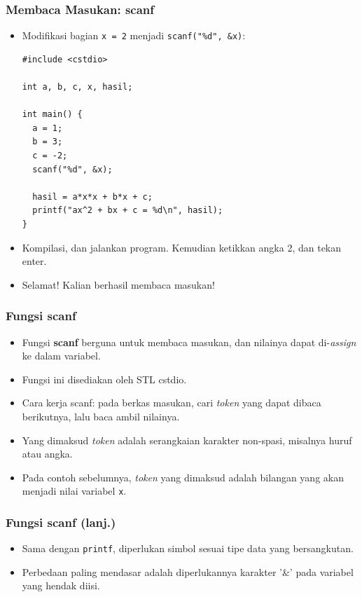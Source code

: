 \begin{frame}[fragile]
\frametitle{Membaca Masukan: scanf}
\begin{itemize}
  \item Modifikasi bagian \texttt{x = 2} menjadi \texttt{scanf("\%d", \&x)}:
\begin{lstlisting}
#include <cstdio>

int a, b, c, x, hasil;

int main() {
  a = 1;
  b = 3;
  c = -2;
  scanf("%d", &x);

  hasil = a*x*x + b*x + c;
  printf("ax^2 + bx + c = %d\n", hasil);
}
\end{lstlisting}
  \item Kompilasi, dan jalankan program. Kemudian ketikkan angka 2, dan tekan enter.
  \item Selamat! Kalian berhasil membaca masukan!
\end{itemize}
\end{frame}

\begin{frame}[fragile]
\frametitle{Fungsi scanf}
  \begin{itemize}
    \item Fungsi \textbf{scanf} berguna untuk membaca masukan, dan nilainya dapat di-\textit{assign} ke dalam variabel.
    \item Fungsi ini disediakan oleh STL cstdio.
    \item Cara kerja scanf: pada berkas masukan, cari \textit{token} yang dapat dibaca berikutnya, lalu baca ambil nilainya.
    \item Yang dimaksud \textit{token} adalah serangkaian karakter non-spasi, misalnya huruf atau angka.
    \item Pada contoh sebelumnya, \textit{token} yang dimaksud adalah bilangan yang akan menjadi nilai variabel \texttt{x}.
  \end{itemize}
\end{frame}


\begin{frame}[fragile]
\frametitle{Fungsi scanf (lanj.)}
  \begin{itemize}
    \item Sama dengan \texttt{printf}, diperlukan simbol sesuai tipe data yang bersangkutan.
    \item Perbedaan paling mendasar adalah diperlukannya karakter '\&' pada variabel yang hendak diisi.
  \end{itemize}
\end{frame}

